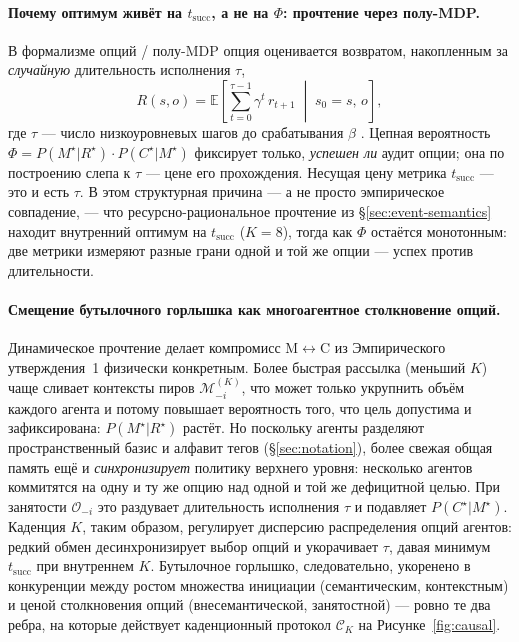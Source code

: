 \documentclass{article}
\begin{document}
\paragraph{Почему оптимум живёт на $t_{\mathrm{succ}}$, а не на $\Phi$: прочтение через полу-MDP.}
В формализме опций / полу-MDP опция оценивается
возвратом, накопленным за \emph{случайную} длительность исполнения $\tau$,
\[
R(s,o)=\mathbb{E}\!\left[\textstyle\sum_{t=0}^{\tau-1}\gamma^{t}\,r_{t+1}\;\middle|\;s_0=s,\,o\right],
\]
где $\tau$ --- число низкоуровневых шагов до срабатывания $\beta$
\citep{sutton1999between}. Цепная вероятность
$\Phi=P(M^\star|R^\star)\!\cdot\!P(C^\star|M^\star)$ фиксирует только,
\emph{успешен ли} аудит опции; она по построению слепа к
$\tau$ --- цене его прохождения. Несущая цену метрика
$t_{\mathrm{succ}}$ --- это и есть $\tau$. В этом структурная причина --- а не
просто эмпирическое совпадение, --- что ресурсно-рациональное прочтение из
\S\ref{sec:event-semantics} \citep{lieder2020resource} находит
внутренний оптимум на $t_{\mathrm{succ}}$ ($K{=}8$), тогда как $\Phi$ остаётся
монотонным: две метрики измеряют разные грани одной и той же опции ---
успех против длительности.

\paragraph{Смещение бутылочного горлышка как многоагентное столкновение опций.}
Динамическое прочтение делает компромисс M$\leftrightarrow$C из
Эмпирического утверждения~1 физически конкретным. Более быстрая рассылка (меньший $K$)
чаще сливает контексты пиров $\mathcal{M}^{(K)}_{-i}$, что может только
укрупнить объём каждого агента и потому повышает вероятность того, что
цель допустима и зафиксирована: $P(M^\star|R^\star)$ растёт. Но
поскольку агенты разделяют пространственный базис и алфавит тегов
(\S\ref{sec:notation}), более свежая общая память ещё и \emph{синхронизирует}
политику верхнего уровня: несколько агентов коммитятся на одну и ту же опцию над
одной и той же дефицитной целью. При занятости $\mathcal{O}_{-i}$ это раздувает
длительность исполнения $\tau$ и подавляет $P(C^\star|M^\star)$. Каденция
$K$, таким образом, регулирует дисперсию распределения опций агентов:
редкий обмен десинхронизирует выбор опций и укорачивает $\tau$,
давая минимум $t_{\mathrm{succ}}$ при внутреннем $K$. Бутылочное горлышко,
следовательно, укоренено в конкуренции между
ростом множества инициации (семантическим, контекстным) и ценой столкновения опций
(внесемантической, занятостной) --- ровно те два ребра, на которые действует каденционный протокол
$\mathcal{C}_K$ на Рисунке~\ref{fig:causal}.
\end{document}
